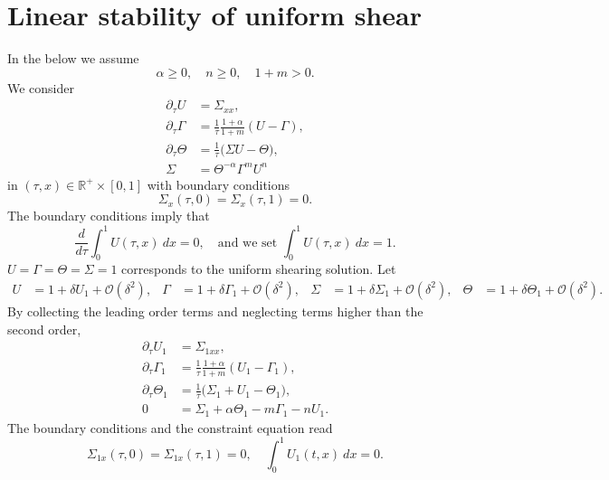 \documentclass[a4paper,11pt]{article}
\theoremstyle{remark}
\begin{document}
\section{Linear stability of uniform shear}
In the below we assume
$$ \alpha\ge0, \quad n\ge0, \quad 1+m>0.$$
We consider
\begin{equation} \label{eq:system}
 \begin{aligned}
  \partial_\tau U &= \Sigma_{xx},\\
  \partial_\tau\Gamma &= \frac{1}{\tau}\frac{1+\alpha}{1+m}(U-\Gamma),\\
  \partial_\tau\Theta &= \frac{1}{\tau}\Big(\Sigma U -\Theta\Big),\\
  \Sigma &= \Theta^{-\alpha}\Gamma^m U^n
 \end{aligned}
\end{equation}
in $(\tau,x)\in \mathbb{R}^+\times [0,1]$ with boundary conditions
\begin{equation}
 \Sigma_x(\tau,0)=\Sigma_x(\tau,1)=0.
\end{equation}
The boundary conditions imply that
\begin{equation}
 \frac{d}{d\tau}\int_0^1 U(\tau,x) \: dx = 0, \quad \text{and we set } \int_0^1 U(\tau,x) \: dx = 1.
\end{equation}
$ U=\Gamma=\Theta=\Sigma=1 $ corresponds to the uniform shearing solution.
Let
\begin{align*}
 U &= 1 + \delta U_1 + \mathcal{O}(\delta^2), & \Gamma &= 1 + \delta \Gamma_1 + \mathcal{O}(\delta^2), &
 \Sigma &= 1 + \delta \Sigma_1 + \mathcal{O}(\delta^2), & \Theta &= 1 + \delta \Theta_1 + \mathcal{O}(\delta^2).
\end{align*}
By collecting the leading order terms and neglecting terms higher than the  second order,
\begin{equation} \label{eq:linsystem}
 \begin{aligned}
  \partial_\tau U_1 &= \Sigma_{1xx},\\
  \partial_\tau\Gamma_1 &= \frac{1}{\tau}\frac{1+\alpha}{1+m}(U_1-\Gamma_1),\\
  \partial_\tau\Theta_1 &= \frac{1}{\tau}\Big(\Sigma_1+ U_1 -\Theta_1\Big),\\
  0&=\Sigma_1 + \alpha\Theta_1 -m\Gamma_1 - nU_1 .
 \end{aligned}
\end{equation}
The boundary conditions and the constraint equation read
\begin{equation} \label{eq:linbdry}
 \Sigma_{1x}(\tau,0)=\Sigma_{1x}(\tau,1)=0, \quad \int_0^1 U_1(t,x) \: dx = 0.
\end{equation}
\end{document}
